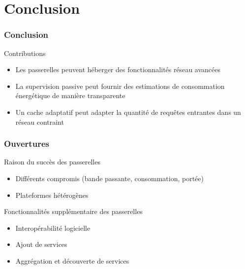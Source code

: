 \section{Conclusion}

\begin{frame}\frametitle{Conclusion}

  \begin{alertblock}{Contributions}
    \begin{itemize}
      \item Les passerelles peuvent héberger des fonctionnalités réseau avancées
      \item La supervision passive peut fournir des estimations de consommation énergétique de manière transparente
      \item Un cache adaptatif peut adapter la quantité de requêtes entrantes dans un réseau contraint
    \end{itemize}
  \end{alertblock}

\end{frame}

\begin{frame}\frametitle{Ouvertures}
  \begin{block}{Raison du succès des passerelles}
    \begin{itemize}
      \item Différents compromis (bande passante, consommation, portée)
      \item Plateformes hétérogènes
    \end{itemize}
  \end{block}

  \begin{alertblock}{Fonctionnalités supplémentaire des passerelles}
    \begin{itemize}
      \item Interopérabilité logicielle
      \item Ajout de services
      \item Aggrégation et découverte de services
    \end{itemize}
  \end{alertblock}


  \pnote{---}
\end{frame}



